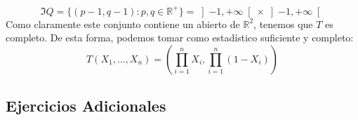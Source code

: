 \begin{ejercicio}
\begin{enumerate}[label=\alph*)]
            \begin{equation*}
                \Im Q = \{(p-1,q-1):p,q\in \mathbb{R}^+\} = \left]-1,+\infty\right[\times \left]-1,+\infty\right[
            \end{equation*}
            Como claramente este conjunto contiene un abierto de $\mathbb{R}^2$, tenemos que $T$ es completo. De esta forma, podemos tomar como estadístico suficiente y completo:
            \begin{equation*}
                T(X_1, \ldots, X_n) = \left(\prod_{i=1}^{n}X_i, \prod_{i=1}^{n}(1-X_i)\right)
            \end{equation*}
    \end{enumerate}
\end{ejercicio}

\subsection*{Ejercicios Adicionales}

